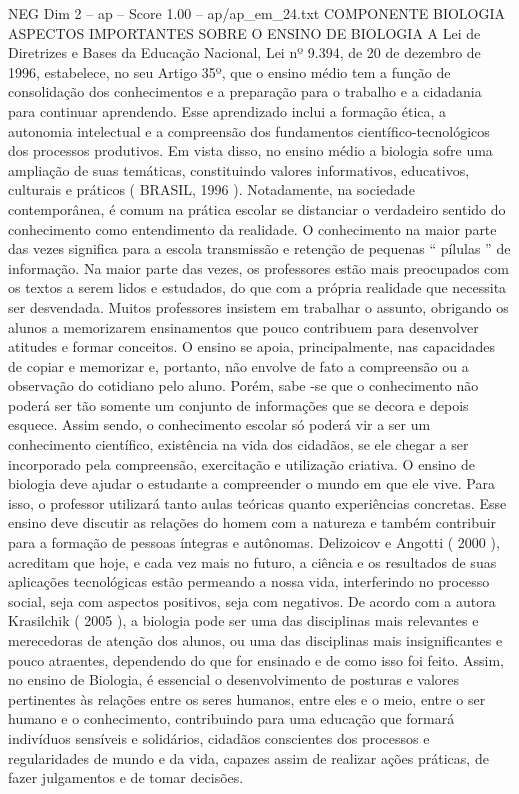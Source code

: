 \begin{textsample}{NEG Dim 2 – ap – Score 1.00 – ap/ap\_em\_24.txt}  \label{ex:f2_neg_150}
COMPONENTE BIOLOGIA ASPECTOS IMPORTANTES SOBRE O ENSINO DE BIOLOGIA A Lei de Diretrizes e Bases da Educação Nacional, Lei nº 9.394, de 20 de dezembro de 1996, estabelece, no seu Artigo 35º, que o ensino médio tem a função de consolidação dos conhecimentos e a preparação para o trabalho e a cidadania para continuar aprendendo.
Esse aprendizado inclui a formação ética, a autonomia intelectual e a compreensão dos fundamentos científico-tecnológicos dos processos produtivos.
Em vista disso, no ensino médio a biologia sofre uma ampliação de suas temáticas, constituindo valores informativos, educativos, culturais e práticos ( BRASIL, 1996 ).
Notadamente, na sociedade contemporânea, é comum na prática escolar se distanciar o verdadeiro sentido do conhecimento como entendimento da realidade.
O conhecimento na maior parte das vezes significa para a escola transmissão e retenção de pequenas “ pílulas ” de informação.
Na maior parte das vezes, os professores estão mais preocupados com os textos a serem lidos e estudados, do que com a própria realidade que necessita ser desvendada.
Muitos professores insistem em trabalhar o assunto, obrigando os alunos a memorizarem ensinamentos que pouco contribuem para desenvolver atitudes e formar conceitos.
O ensino se apoia, principalmente, nas capacidades de copiar e memorizar e, portanto, não envolve de fato a compreensão ou a observação do cotidiano pelo aluno.
Porém, sabe -se que o conhecimento não poderá ser tão somente um conjunto de informações que se decora e depois esquece.
Assim sendo, o conhecimento escolar só poderá vir a ser um conhecimento científico, existência na vida dos cidadãos, se ele chegar a ser incorporado pela compreensão, exercitação e utilização criativa.
O ensino de biologia deve ajudar o estudante a compreender o mundo em que ele vive.
Para isso, o professor utilizará tanto aulas teóricas quanto experiências concretas.
Esse ensino deve discutir as relações do homem com a natureza e também contribuir para a formação de pessoas íntegras e autônomas.
Delizoicov e Angotti ( 2000 ), acreditam que hoje, e cada vez mais no futuro, a ciência e os resultados de suas aplicações tecnológicas estão permeando a nossa vida, interferindo no processo social, seja com aspectos positivos, seja com negativos.
De acordo com a autora Krasilchik ( 2005 ), a biologia pode ser uma das disciplinas mais relevantes e merecedoras de atenção dos alunos, ou uma das disciplinas mais insignificantes e pouco atraentes, dependendo do que for ensinado e de como isso foi feito.
Assim, no ensino de Biologia, é essencial o desenvolvimento de posturas e valores pertinentes às relações entre os seres humanos, entre eles e o meio, entre o ser humano e o conhecimento, contribuindo para uma educação que formará indivíduos sensíveis e solidários, cidadãos conscientes dos processos e regularidades de mundo e da vida, capazes assim de realizar ações práticas, de fazer julgamentos e de tomar decisões.

\end{textsample}
